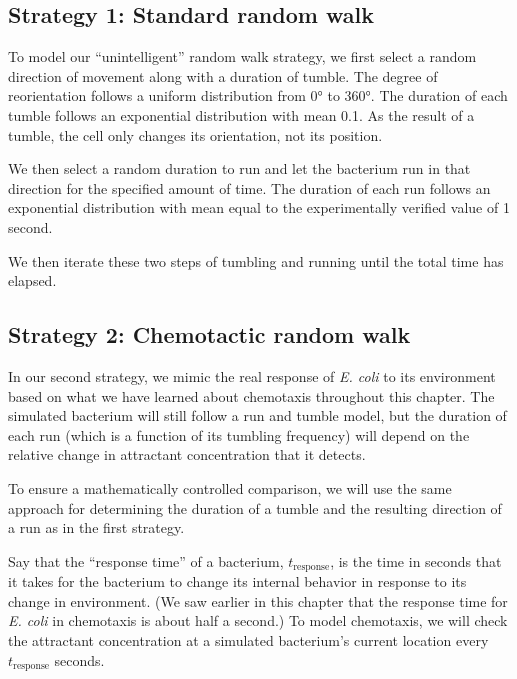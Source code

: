\FloatBarrier
{}
\subsection{Strategy 1: Standard random walk}

To model our ``unintelligent'' random walk strategy, we first select a random direction of movement along with a duration of tumble. The degree of reorientation follows a uniform distribution from 0° to 360°. The duration of each tumble follows an exponential distribution with mean 0.1. As the result of a tumble, the cell only changes its orientation, not its position.

We then select a random duration to run and let the bacterium run in that direction for the specified amount of time. The duration of each run follows an exponential distribution with mean equal to the experimentally verified value of 1 second.

We then iterate these two steps of tumbling and running until the total time has elapsed.

\FloatBarrier
{}
\subsection{Strategy 2: Chemotactic random walk}


In our second strategy, we mimic the real response of \textit{E. coli} to its environment based on what we have learned about chemotaxis throughout this chapter. The simulated bacterium will still follow a run and tumble model, but the duration of each run (which is a function of its tumbling frequency) will depend on the relative change in attractant concentration that it detects.

To ensure a mathematically controlled comparison, we will use the same approach for determining the duration of a tumble and the resulting direction of a run as in the first strategy.

Say that the ``response time'' of a bacterium, $t_{\text{response}}$, is the time in seconds that it takes for the bacterium to change its internal behavior in response to its change in environment. (We saw earlier in this chapter that the response time for \textit{E. coli} in chemotaxis is about half a second.) To model chemotaxis, we will check the attractant concentration at a simulated bacterium's current location every $t_{\text{response}}$ seconds.

